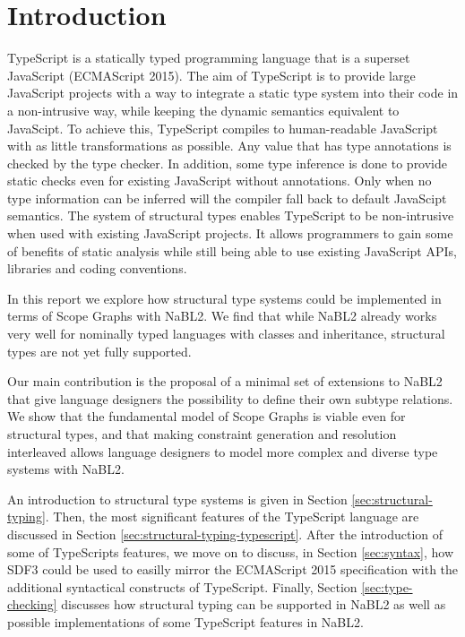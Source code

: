 \section{Introduction}

TypeScript is a statically typed programming language that is a superset JavaScript (ECMAScript 2015).
The aim of TypeScript is to provide large JavaScript projects with a way to integrate a static 
type system into their code in a non-intrusive way, 
while keeping the dynamic semantics equivalent to JavaScipt.
To achieve this, TypeScript compiles to human-readable JavaScript with as little transformations as possible.
Any value that has type annotations is checked by the type checker.
In addition, some type inference is done to provide static checks even for existing JavaScript without annotations.
Only when no type information can be inferred will the compiler fall back to default JavaScipt semantics.
The system of structural types enables TypeScript to be non-intrusive when used with existing JavaScript projects.
It allows programmers to gain some of benefits of static analysis while still 
being able to use existing JavaScript APIs, libraries and coding conventions.

In this report we explore how structural type systems could be implemented in terms of Scope 
Graphs with NaBL2\citep{Antwerpen:2016:CLS:2847538.2847543}.
We find that while NaBL2 already works very well for nominally typed languages with classes and inheritance,
structural types are not yet fully supported. 

Our main contribution is the proposal of a minimal set of extensions to NaBL2 that 
give language designers the possibility to define their own subtype relations. 
We show that the fundamental model of Scope Graphs is viable even for structural types, 
and that making constraint generation and resolution interleaved
allows language designers to model more complex and diverse type systems with NaBL2.

An introduction to structural type systems is given in Section \ref{sec:structural-typing}.
Then, the most significant features of the TypeScript language are discussed in Section \ref{sec:structural-typing-typescript}.
After the introduction of some of TypeScripts features, we move on to discuss, in Section \ref{sec:syntax}, how SDF3 could be used to 
easilly mirror the ECMAScript 2015 specification with the additional syntactical constructs of TypeScript.
Finally, Section \ref{sec:type-checking} discusses how structural typing can be supported in NaBL2 
as well as possible implementations of some TypeScript features in NaBL2.

